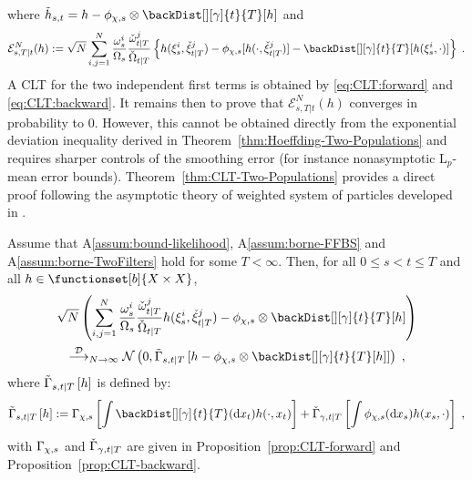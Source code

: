where $\tilde{h}_{s,t} = h - \filt{\Xinit,s}\otimes\backDist[][\gamma]{t}{T}[h]$ and
\[
\mathcal{E}^{N}_{s,T|t}(h) \eqdef \sqrt{N}\sum_{i,j=1}^N \frac{\swght{s}{i}}{\sumwght{s}}\frac{\ebackwght{t}{T}{j}}{\backsumwght{t}{T}}\left\{h(\epartpred{s}{i},\ebackpart{t}{T}{j}) -  \filt{\Xinit,s}[h(\cdot,\ebackpart{t}{T}{j})]  - \backDist[][\gamma]{t}{T}[h(\epartpred{s}{i},\cdot)]\right\}\eqsp.
\]
A CLT for the two independent first terms is obtained by \eqref{eq:CLT:forward} and \eqref{eq:CLT:backward}. It remains then to prove that $\mathcal{E}^{N}_{s,T|t}(h)$ converges in probability to $0$. However, this cannot be obtained directly from the exponential deviation inequality derived in Theorem~\ref{thm:Hoeffding-Two-Populations} and requires sharper controls of the smoothing error (for instance nonasymptotic $\mathrm{L}_p$-mean error bounds).
Theorem~\ref{thm:CLT-Two-Populations}  provides a direct proof following the asymptotic theory of weighted system of particles developed in \cite{douc:moulines:2008}.
\begin{thm}
\label{thm:CLT-Two-Populations}
Assume that A\ref{assum:bound-likelihood}, A\ref{assum:borne-FFBS} and A\ref{assum:borne-TwoFilters} hold for some $T<\infty$. Then,  for all $0 \leq s<t \leq T$ and all $h \in \functionset[b]{X\times X}$,
\begin{multline*}
\sqrt{N}\left(\sum_{i,j=1}^N \frac{\swght{s}{i}}{\sumwght{s}}\frac{\ebackwght{t}{T}{j}}{\backsumwght{t}{T}} h(\epartpred{s}{i},\ebackpart{t}{T}{j}) - \filt{\Xinit,s}\otimes \backDist[][\gamma]{t}{T}[h]
\right) \\
\dlim_{N \to \infty} \mathcal{N}\left(0,\asymVarJoint{s,t}{T}{h- \filt{\Xinit,s}\otimes \backDist[][\gamma]{t}{T}[h]}\right) \eqsp,
\end{multline*}
where $\asymVarJoint{s,t}{T}{h}$ is defined by:
\begin{equation}
\label{eq:asymVarjoint}
\asymVarJoint{s,t}{T}{h} \eqdef \asymVar[\Xinit]{s}{\int \backDist[][\gamma]{t}{T}(\rmd x_t)h(\cdot,x_t)} +  \backasymVar[\gamma]{t}{T}{\int \filt{\Xinit,s}(\rmd x_{s}) h(x_s,\cdot)}\eqsp,
\end{equation}
with $\asymVar[\Xinit]{s}{}$ and $\backasymVar[\gamma]{t}{T}{}$ are given in Proposition~\ref{prop:CLT-forward} and Proposition~\ref{prop:CLT-backward}.
\end{thm}


